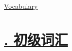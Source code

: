 \documentclass[11pt]{article}
\begin{document}
	\kaishu 
	\setcounter{section}{0}
	\begin{center}
		{\LARGE  \href{https://www.youtube.com/@jing-xin/playlists}{Vocabulary}}
	\end{center}
\setcounter{page}{1}

\vspace{-0.5cm}

\section*{\normalfont \large \href{https://www.youtube.com/watch?v=_8q3VWJB84o&list=PL7aIrlqqP5K_VeAi4oEExgri0o7VVBIXM}{. 初级词汇} }

\vspace{-0.5cm}
\end{document}
